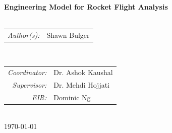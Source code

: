 \begin{titlepage}

\HRule \\[0.6cm]
{ \Huge \bfseries 
Engineering Model for Rocket Flight Analysis
}\\[0.4cm] 

\HRule \\[1cm]
 

\begin{minipage}{0.4\textwidth}
\begin{flushleft} \large
	\begin{tabular} {r l} 
        \emph{Author(s):} & Shawn Bulger	\\
	\end{tabular}
\end{flushleft}
\end{minipage}
~
\begin{minipage}{0.4\textwidth}
\begin{flushright} \large
	\begin{tabular} {r l} 
		\emph{Coordinator:} & Dr. Ashok Kaushal 		\\
		\emph{Supervisor:}  & Dr. Mehdi Hojjati 		\\
		\emph{EIR:}         & Dominic Ng  		        \\
	\end{tabular}
\end{flushright}
\end{minipage}\\[2cm]


{\large \today}\\[2cm] %

\vfill %

\end{titlepage}
